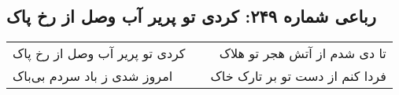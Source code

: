 \begin{center}
\section*{رباعی شماره ۲۴۹: کردی تو پریر آب وصل از رخ پاک}
\label{sec:sh249}
\begin{longtable}{l p{0.5cm} r}
کردی تو پریر آب وصل از رخ پاک
&&
تا دی شدم از آتش هجر تو هلاک
\\
امروز شدی ز باد سردم بی‌باک
&&
فردا کنم از دست تو بر تارک خاک
\\
\end{longtable}
\end{center}
